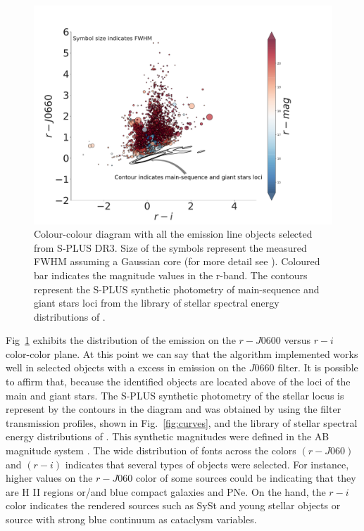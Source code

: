 \documentclass[fleqn,usenatbib]{mnras}
\begin{document}
\begin{figure}
	\includegraphics[width=0.9\linewidth]{Figs/final-emitters.pdf}
        \caption{Colour-colour diagram with all the emission line objects selected
          from S-PLUS DR3. Size of the symbols represent the measured FWHM assuming
          a Gaussian core (for more detail see \citealt{Fernandes:2021}). Coloured
          bar indicates the magnitude values in the r-band. The contours represent
          the S-PLUS synthetic photometry of main-sequence and giant stars loci from 
          the library of stellar spectral energy distributions of \citet{Pickles:1998}.}
    \label{fig:emission}
\end{figure}

Fig~\ref{fig:emission} exhibits the distribution of the emission on the
$r - J0600$ versus $r - i$ color-color plane. At this point we can say that
the algorithm implemented works well in selected objects with a excess in emission
on the $J$0660 filter. It is possible to affirm that, because the identified objects
are located  above of the loci of the main and giant stars. The S-PLUS synthetic photometry
of the stellar locus is represent by the contours in the diagram and was obtained by using the
filter transmission profiles, shown in Fig.~\ref{fig:curves}, and the library of stellar
spectral energy distributions of \citet{Pickles:1998}. This synthetic magnitudes were
defined in the AB magnitude system \citep{Oke:1983}. The wide distribution of fonts across
the colors $ (r - J060) $ and $ (r - i) $ indicates that several types of objects were selected.
For instance, higher values on the  $r - J060$ color of some sources could be indicating
that they are H II regions or/and blue compact galaxies and PNe. On the hand, the 
$r - i$ color indicates the rendered sources such as SySt and young stellar objects
or source with strong blue continuum as cataclysm variables.
\end{document}
